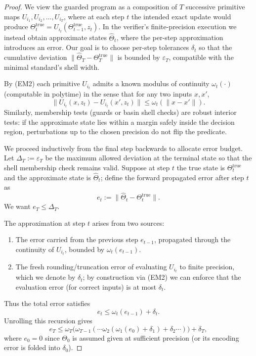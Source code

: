 \documentclass[12pt]{article}
\theoremstyle{definition}
\theoremstyle{plain}
\begin{document}
\begin{proof}
We view the guarded program as a composition of \(T\) successive primitive maps \(U_{i_1},U_{i_2},\dots,U_{i_T}\), where at each step \(t\) the intended exact update would produce \(\Theta_t^{\mathrm{true}} = U_{i_t}(\Theta_{t-1}^{\mathrm{true}}, z_t)\). In the verifier’s finite-precision execution we instead obtain approximate states \(\widehat\Theta_t\), where the per-step approximation introduces an error. Our goal is to choose per-step tolerances \(\delta_t\) so that the cumulative deviation \(\|\widehat\Theta_T - \Theta_T^{\mathrm{true}}\|\) is bounded by \(\varepsilon_T\), compatible with the minimal standard’s shell width.

By (EM2) each primitive \(U_{i_t}\) admits a known modulus of continuity \( \omega_t(\cdot)\) (computable in polytime) in the sense that for any two inputs \(x,x'\),
\[
\| U_{i_t}(x,z_t) - U_{i_t}(x',z_t) \| \le \omega_t(\|x - x'\|).
\]
Similarly, membership tests (guards or basin shell checks) are robust interior tests: if the approximate state lies within a margin safely inside the decision region, perturbations up to the chosen precision do not flip the predicate.

We proceed inductively from the final step backwards to allocate error budget. Let \(\Delta_T := \varepsilon_T\) be the maximum allowed deviation at the terminal state so that the shell membership check remains valid. Suppose at step \(t\) the true state is \(\Theta_t^{\mathrm{true}}\) and the approximate state is \(\widehat\Theta_t\); define the forward propagated error after step \(t\) as
\[
e_t := \|\widehat\Theta_t - \Theta_t^{\mathrm{true}}\|.
\]
We want \(e_T \le \Delta_T\).

The approximation at step \(t\) arises from two sources:
\begin{enumerate}
  \item The error carried from the previous step \(e_{t-1}\), propagated through the continuity of \(U_{i_t}\), bounded by \(\omega_t(e_{t-1})\).
  \item The fresh rounding/truncation error of evaluating \(U_{i_t}\) to finite precision, which we denote by \(\delta_t\); by construction via (EM2) we can enforce that the evaluation error (for correct inputs) is at most \(\delta_t\).
\end{enumerate}
Thus the total error satisfies
\[
e_t \le \omega_t(e_{t-1}) + \delta_t.
\]
Unrolling this recursion gives
\[
e_T \le \omega_T\bigl(\omega_{T-1}(\cdots \omega_2(\omega_1(e_0) + \delta_1) + \delta_2\cdots )\bigr) + \delta_T,
\]
where \(e_0=0\) since \(\Theta_0\) is assumed given at sufficient precision (or its encoding error is folded into \(\delta_0\)).


\end{proof}
\end{document}
